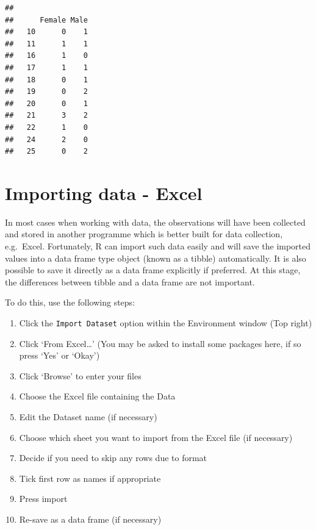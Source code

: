 \documentclass[
]{book}
\newenvironment{Shaded}{\begin{snugshade}}{\end{snugshade}}
\newcommand{\FunctionTok}[1]{\textcolor[rgb]{0.00,0.00,0.00}{#1}}
\newcommand{\NormalTok}[1]{#1}
\newcommand{\SpecialCharTok}[1]{\textcolor[rgb]{0.00,0.00,0.00}{#1}}
\providecommand{\tightlist}{%
  \setlength{\itemsep}{0pt}\setlength{\parskip}{0pt}}
\theoremstyle{definition}
\theoremstyle{definition}
\theoremstyle{definition}
\theoremstyle{definition}
\theoremstyle{remark}
\begin{document}
\begin{Shaded}
\end{Shaded}

\begin{verbatim}
##     
##      Female Male
##   10      0    1
##   11      1    1
##   16      1    0
##   17      1    1
##   18      0    1
##   19      0    2
##   20      0    1
##   21      3    2
##   22      1    0
##   24      2    0
##   25      0    2
\end{verbatim}

\hypertarget{importing-data---excel}{%
\section{Importing data - Excel}\label{importing-data---excel}}

In most cases when working with data, the observations will have been collected and stored in another programme which is better built for data collection, e.g.~Excel. Fortunately, R can import such data easily and will save the imported values into a data frame type object (known as a tibble) automatically. It is also possible to save it directly as a data frame explicitly if preferred. At this stage, the differences between tibble and a data frame are not important.

To do this, use the following steps:

\begin{enumerate}
\def\labelenumi{\arabic{enumi}.}
\tightlist
\item
  Click the \texttt{Import\ Dataset} option within the Environment window (Top right)
\item
  Click `From Excel\ldots{}' (You may be asked to install some packages here, if so press `Yes' or `Okay')
\item
  Click `Browse' to enter your files
\item
  Choose the Excel file containing the Data
\item
  Edit the Dataset name (if necessary)
\item
  Choose which sheet you want to import from the Excel file (if necessary)
\item
  Decide if you need to skip any rows due to format
\item
  Tick first row as names if appropriate
\item
  Press import
\item
  Re-save as a data frame (if necessary)
\end{enumerate}
\end{document}
